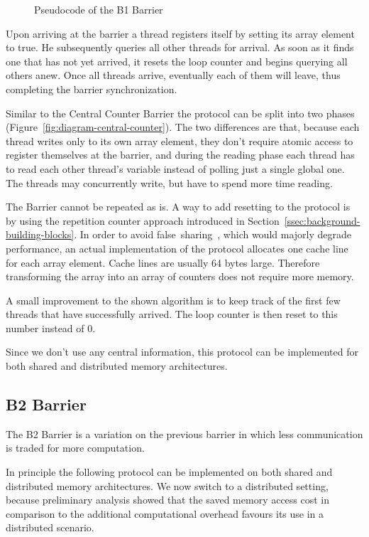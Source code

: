 \documentclass[a4paper, 10pt]{article}
\begin{document}
\begin{figure}[htbp]
	\centering
	
	\caption{Pseudocode of the B1 Barrier}
	\label{fig:pseudocode-b1}
\end{figure}

Upon arriving at the barrier a thread registers itself by setting its array element to true. He subsequently queries all other threads for arrival. As soon as it finds one that has not yet arrived, it resets the loop counter and begins querying all others anew. Once all threads arrive, eventually each of them will leave, thus completing the barrier synchronization.

Similar to the Central Counter Barrier the protocol can be split into two phases (Figure~\ref{fig:diagram-central-counter}).
The two differences are that, because each thread writes only to its own array element, they don't require atomic access to register themselves at the barrier, and during the reading phase each thread has to read each other thread's variable instead of polling just a single global one. The threads may concurrently write, but have to spend more time reading.

The Barrier cannot be repeated as is. A way to add resetting to the protocol is by using the repetition counter approach introduced in Section~\ref{ssec:background-building-blocks}. In order to avoid false~sharing~\cite{falsesharing}, which would majorly degrade performance, an actual implementation of the protocol allocates one cache line for each array element. Cache lines are usually 64 bytes large. Therefore transforming the array into an array of counters does not require more memory.

A small improvement to the shown algorithm is to keep track of the first few threads that have successfully arrived. The loop counter is then reset to this number instead of 0.

Since we don't use any central information, this protocol can be implemented for both shared and distributed memory architectures.

\subsection{B2 Barrier}
\label{ssec:new-b2}
The B2 Barrier is a variation on the previous barrier in which less communication is traded for more computation.

In principle the following protocol can be implemented on both shared and distributed memory architectures. We now switch to a distributed setting, because preliminary analysis showed that the saved memory access cost in comparison to the additional computational overhead favours its use in a distributed scenario.
\end{document}
